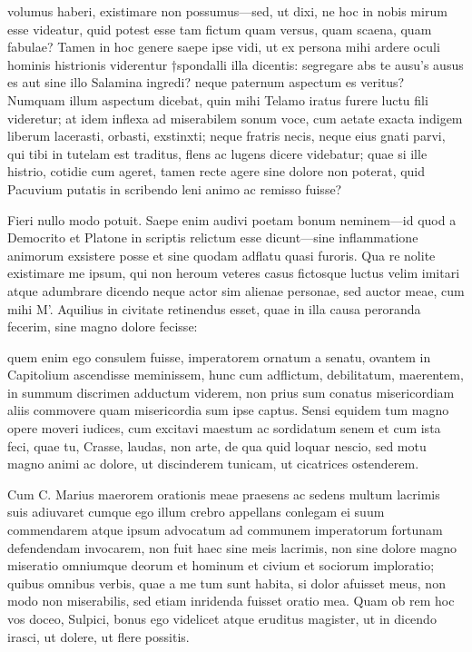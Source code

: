  volumus haberi, existimare non possumus—sed, ut dixi, ne hoc in nobis mirum esse videatur, quid potest esse tam fictum quam versus, quam scaena, quam fabulae? Tamen in hoc genere saepe ipse vidi, ut ex persona mihi ardere oculi hominis histrionis viderentur †spondalli illa dicentis: segregare abs te ausu's ausus es aut sine illo Salamina ingredi? neque paternum aspectum es veritus? Numquam illum aspectum dicebat, quin mihi Telamo iratus furere luctu fili videretur; at idem inflexa ad miserabilem sonum voce, cum aetate exacta indigem liberum lacerasti, orbasti, exstinxti; neque fratris necis, neque eius gnati parvi, qui tibi in tutelam est traditus, flens ac lugens dicere videbatur; quae si ille histrio, cotidie cum ageret, tamen recte agere sine dolore non poterat, quid Pacuvium putatis in scribendo leni animo ac remisso fuisse?

 Fieri nullo modo potuit. Saepe enim audivi poetam bonum neminem—id quod a Democrito et Platone in scriptis relictum esse dicunt—sine inflammatione animorum exsistere posse et sine quodam adflatu quasi furoris. Qua re nolite existimare me ipsum, qui non heroum veteres casus fictosque luctus velim imitari atque adumbrare dicendo neque actor sim alienae personae, sed auctor meae, cum mihi M'. Aquilius in civitate retinendus esset, quae in illa causa peroranda fecerim, sine magno dolore fecisse:

 quem enim ego consulem fuisse, imperatorem ornatum a senatu, ovantem in Capitolium ascendisse meminissem, hunc cum adflictum, debilitatum, maerentem, in summum discrimen adductum viderem, non prius sum conatus misericordiam aliis commovere quam misericordia sum ipse captus. Sensi equidem tum magno opere moveri iudices, cum excitavi maestum ac sordidatum senem et cum ista feci, quae tu, Crasse, laudas, non arte, de qua quid loquar nescio, sed motu magno animi ac dolore, ut discinderem tunicam, ut cicatrices ostenderem.

 Cum C. Marius maerorem orationis meae praesens ac sedens multum lacrimis suis adiuvaret cumque ego illum crebro appellans conlegam ei suum commendarem atque ipsum advocatum ad communem imperatorum fortunam defendendam invocarem, non fuit haec sine meis lacrimis, non sine dolore magno miseratio omniumque deorum et hominum et civium et sociorum imploratio; quibus omnibus verbis, quae a me tum sunt habita, si dolor afuisset meus, non modo non miserabilis, sed etiam inridenda fuisset oratio mea. Quam ob rem hoc vos doceo, Sulpici, bonus ego videlicet atque eruditus magister, ut in dicendo irasci, ut dolere, ut flere possitis.

